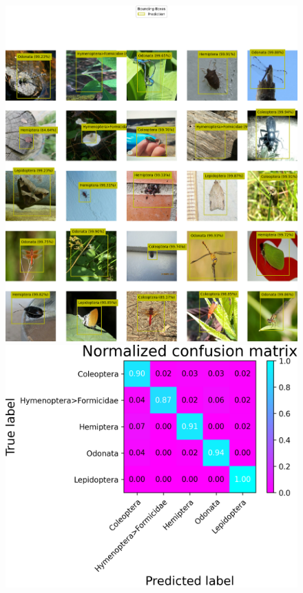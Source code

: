 \begin{figure}
    \centering
    \begin{multicols}{2}
        \begin{minipage}{.45\textwidth}
            \includegraphics[width=\textwidth]{images/tf-lite-independent-model-predictions.png}
        \end{minipage}
        \columnbreak
        \begin{minipage}{.45\textwidth}
            \includegraphics[width=\textwidth]{images/tf-lite-independent-model-confusion.png}

\end{minipage}
\end{multicols}
\end{figure}
